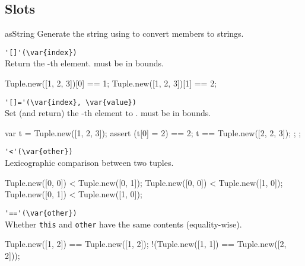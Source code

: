 \subsection{Slots}
\begin{urbiscriptapi}
\item[asString]
  Generate the string  using
   to convert members to strings.

\item \lstinline|'[]'(\var{index})|\\
  Return the -th element.   must be in bounds.
\begin{urbiassert}[firstnumber=last]
Tuple.new([1, 2, 3])[0] == 1;
Tuple.new([1, 2, 3])[1] == 2;
\end{urbiassert}

\item \lstinline|'[]='(\var{index}, \var{value})|\\
  Set (and return) the -th element to .
   must be in bounds.
\begin{urbiscript}[firstnumber=last]
{
  var t = Tuple.new([1, 2, 3]);
  assert
  {
    (t[0] = 2) == 2;
    t == Tuple.new([2, 2, 3]);
  };
};
\end{urbiscript}

\item \lstinline|'<'(\var{other})|\\
  Lexicographic comparison between two tuples.
\begin{urbiassert}[firstnumber=last]
Tuple.new([0, 0]) < Tuple.new([0, 1]);
Tuple.new([0, 0]) < Tuple.new([1, 0]);
Tuple.new([0, 1]) < Tuple.new([1, 0]);
\end{urbiassert}

\item \lstinline|'=='(\var{other})|\\
  Whether \lstinline|this| and \lstinline|other| have the same
  contents (equality-wise).
\begin{urbiassert}[firstnumber=last]
  Tuple.new([1, 2]) == Tuple.new([1, 2]);
!(Tuple.new([1, 1]) == Tuple.new([2, 2]));
\end{urbiassert}
\end{urbiscriptapi}



